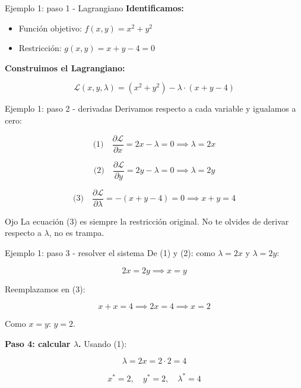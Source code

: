 \documentclass{beamer}
\begin{document}
\begin{frame}{Ejemplo 1: paso 1 - Lagrangiano}
    \small
    \textbf{Identificamos:}
    \begin{itemize}
        \item Función objetivo: $f(x, y) = x^2 + y^2$
        \item Restricción: $g(x, y) = x + y - 4 = 0$
    \end{itemize}

    \vspace{0.8em}

    \textbf{Construimos el Lagrangiano:}

    \[
    \mathcal{L}(x, y, \lambda) = (x^2 + y^2) - \lambda \cdot (x + y - 4)
    \]
\end{frame}

\begin{frame}{Ejemplo 1: paso 2 - derivadas}
    \small
    Derivamos respecto a cada variable y igualamos a cero:

    \vspace{0.5em}

    \[
    \text{(1)} \quad \frac{\partial \mathcal{L}}{\partial x} = 2x - \lambda = 0 \implies \lambda = 2x
    \]

    \[
    \text{(2)} \quad \frac{\partial \mathcal{L}}{\partial y} = 2y - \lambda = 0 \implies \lambda = 2y
    \]

    \[
    \text{(3)} \quad \frac{\partial \mathcal{L}}{\partial \lambda} = -(x + y - 4) = 0 \implies x + y = 4
    \]

    \vspace{0.5em}

    \begin{alertblock}{Ojo}
        La ecuación (3) es siempre la restricción original. No te olvides de derivar respecto a $\lambda$, no es trampa.
    \end{alertblock}
\end{frame}

\begin{frame}{Ejemplo 1: paso 3 - resolver el sistema}
    \small
    De (1) y (2): como $\lambda = 2x$ y $\lambda = 2y$:

    \[
    2x = 2y \implies x = y
    \]

    \vspace{0.5em}

    Reemplazamos en (3):

    \[
    x + x = 4 \implies 2x = 4 \implies x = 2
    \]

    \vspace{0.3em}

    Como $x = y$: $y = 2$.

    \vspace{0.5em}

    \textbf{Paso 4: calcular $\lambda$.} Usando (1):

    \[
    \lambda = 2x = 2 \cdot 2 = 4
    \]

    \vspace{0.5em}

    \[
    \boxed{x^* = 2, \quad y^* = 2, \quad \lambda^* = 4}
    \]
\end{frame}
\end{document}
